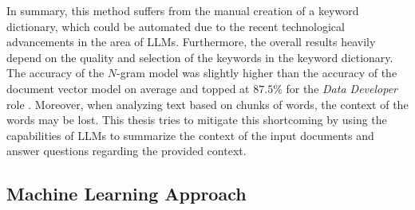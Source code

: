 \documentclass[draft,final]{thesisclass} %
\begin{document}
In summary, this method suffers from the manual creation of a keyword dictionary, which could be automated due to the recent technological advancements in the area of \gls{LLM}s.
Furthermore, the overall results heavily depend on the quality and selection of the keywords in the keyword dictionary.
The accuracy of the $N$-gram model was slightly higher than the accuracy of the document vector model on average and topped at $87.5\%$ for the \textit{Data Developer} role \parencite[47]{text_mining_for_automatic_profiling}.
Moreover, when analyzing text based on chunks of words, the context of the words may be lost.
This thesis tries to mitigate this shortcoming by using the capabilities of \gls{LLM}s to summarize the context of the input documents and answer questions regarding the provided context.

\subsection{Machine Learning Approach} \label{machine_learning_approach}
\end{document}
